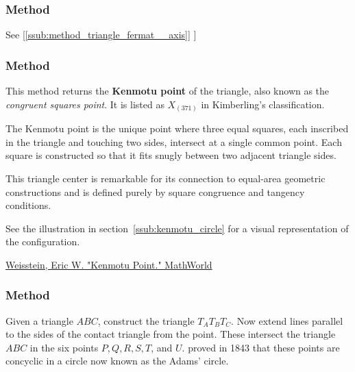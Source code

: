 \subsubsection{Method } %
\label{ssub:method_triangle_second__fermat__point}
See  [\ref{ssub:method_triangle_fermat__axis}]
]

\subsubsection{Method } %
\label{ssub:_triangle_kenmotu__point}

This method returns the \textbf{Kenmotu point} of the triangle, also known as the \emph{congruent squares point}. It is listed as $X_{(371)}$ in Kimberling’s classification.

\medskip
\noindent
The Kenmotu point is the unique point where three equal squares, each inscribed in the triangle and touching two sides, intersect at a single common point. Each square is constructed so that it fits snugly between two adjacent triangle sides.

\medskip
\noindent
This triangle center is remarkable for its connection to equal-area geometric constructions and is defined purely by square congruence and tangency conditions.

\medskip
\noindent
See  the illustration in section~\ref{ssub:kenmotu_circle} for a visual representation of the configuration.

\begin{flushright}
\small
\href{https://mathworld.wolfram.com/KenmotuPoint.html}{Weisstein, Eric W. "Kenmotu Point." MathWorld}
\end{flushright}


\subsubsection{Method } %
\label{ssub:method_triangle_adams_points}
Given a triangle $ABC$, construct the  triangle $T_AT_BT_C$. Now extend lines parallel to the sides of the contact triangle from the  point. These intersect the triangle $ABC$ in the six points $P, Q,  R, S, T$, and $U$.  proved in 1843 that these points are concyclic in a circle now known as the Adams' circle.

